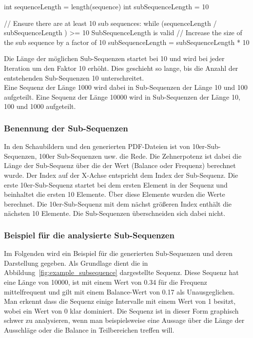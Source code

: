 \begin{SubSequenceLength}
int sequenceLength = length(sequence)
int subSequenceLength = 10

// Ensure there are at least 10 sub sequences:
while (sequenceLength / subSequenceLength ) >= 10
	SubSequenceLength is valid
	// Increase the size of the sub sequence by a factor of 10
	subSequenceLength = subSequenceLength  * 10
\end{SubSequenceLength}

Die Länge der möglichen Sub-Sequenzen startet bei 10 und wird bei jeder Iteration um den Faktor 10 erhöht. 
Dies geschieht so lange, bis die Anzahl der entstehenden Sub-Sequenzen 10 unterschreitet.\\
Eine Sequenz der Länge 1000 wird dabei in Sub-Sequenzen der Länge 10 und 100 aufgeteilt.
Eine Sequenz der Länge 10000 wird in Sub-Sequenzen der Länge 10, 100 und 1000 aufgeteilt.

\subsubsection{Benennung der Sub-Sequenzen}
In den Schaubildern und den generierten PDF-Dateien ist von 10er-Sub-Sequenzen, 100er Sub-Sequenzen usw. die Rede.
Die Zehnerpotenz ist dabei die Länge der Sub-Sequenz über die der Wert (Balance oder Frequenz) berechnet wurde.
Der Index auf der X-Achse entspricht dem Index der Sub-Sequenz.
Die erste 10er-Sub-Sequenz startet bei dem ersten Element in der Sequenz und beinhaltet die ersten 10 Elemente. 
Über diese Elemente wurden die Werte berechnet.
Die 10er-Sub-Sequenz mit dem nächst größeren Index enthält die nächsten 10 Elemente.
Die Sub-Sequenzen überschneiden sich dabei nicht.


\subsubsection{Beispiel für die analysierte Sub-Sequenzen}
Im Folgenden wird ein Beispiel für die generierten Sub-Sequenzen und deren Darstellung gegeben. 
Als Grundlage dient die in Abbildung~\ref{fig:example_subsequence} dargestellte Sequenz. 
Diese Sequenz hat eine Länge von 10000, ist mit einem Wert von 0.34 für die Frequenz mittelfrequent und gilt mit einem Balance-Wert von 0.17 als Unausgeglichen.
Man erkennt dass die Sequenz einige Intervalle mit einem Wert von 1 besitzt, wobei ein Wert von 0 klar dominiert.
Die Sequenz ist in dieser Form graphisch schwer zu analysieren, wenn man beispielsweise eine Aussage über die Länge der Ausschläge oder die Balance in Teilbereichen treffen will.

